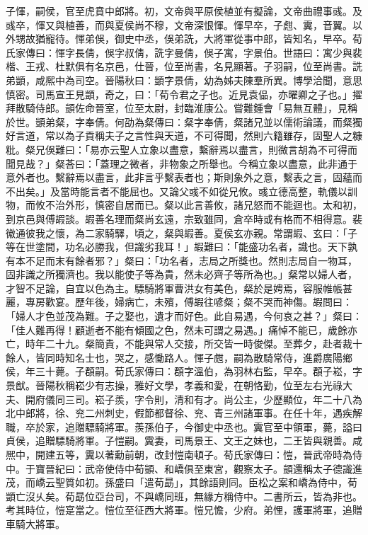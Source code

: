 \begin{pinyinscope}
子惲，嗣侯，官至虎賁中郎將。初，文帝與平原侯植並有擬論，文帝曲禮事彧。及彧卒，惲又與植善，而與夏侯尚不穆，文帝深恨惲。惲早卒，子甝、霬，音翼。以外甥故猶寵待。惲弟俁，御史中丞，俁弟詵，大將軍從事中郎，皆知名，早卒。荀氏家傳曰：惲字長倩，俁字叔倩，詵字曼倩，俁子寓，字景伯。世語曰：寓少與裴楷、王戎、杜默俱有名京邑，仕晉，位至尚書，名見顯著。子羽嗣，位至尚書。詵弟顗，咸熈中為司空。晉陽秋曰：顗字景倩，幼為姊夫陳羣所異。博學洽聞，意思慎密。司馬宣王見顗，奇之，曰：「荀令君之子也。近見袁偘，亦曜卿之子也。」擢拜散騎侍郎。顗佐命晉室，位至太尉，封臨淮康公。嘗難鍾會「易無互體」，見稱於世。顗弟粲，字奉倩。何劭為粲傳曰：粲字奉倩，粲諸兄並以儒術論議，而粲獨好言道，常以為子貢稱夫子之言性與天道，不可得聞，然則六籍雖存，固聖人之糠粃。粲兄俁難曰：「易亦云聖人立象以盡意，繫辭焉以盡言，則微言胡為不可得而聞見哉？」粲荅曰：「蓋理之微者，非物象之所舉也。今稱立象以盡意，此非通于意外者也。繫辭焉以盡言，此非言乎繫表者也；斯則象外之意，繫表之言，固蘊而不出矣。」及當時能言者不能屈也。又論父彧不如從兄攸。彧立德高整，軌儀以訓物，而攸不治外形，慎密自居而已。粲以此言善攸，諸兄怒而不能迴也。太和初，到京邑與傅嘏談。嘏善名理而粲尚玄遠，宗致雖同，倉卒時或有格而不相得意。裴徽通彼我之懷，為二家騎驛，頃之，粲與嘏善。夏侯玄亦親。常謂嘏、玄曰：「子等在世塗間，功名必勝我，但識劣我耳！」嘏難曰：「能盛功名者，識也。天下孰有本不足而末有餘者邪？」粲曰：「功名者，志局之所獎也。然則志局自一物耳，固非識之所獨濟也。我以能使子等為貴，然未必齊子等所為也。」粲常以婦人者，才智不足論，自宜以色為主。驃騎將軍曹洪女有美色，粲於是娉焉，容服帷帳甚麗，專房歡宴。歷年後，婦病亡，未殯，傅嘏往喭粲；粲不哭而神傷。嘏問曰：「婦人才色並茂為難。子之娶也，遺才而好色。此自易遇，今何哀之甚？」粲曰：「佳人難再得！顧逝者不能有傾國之色，然未可謂之易遇。」痛悼不能已，歲餘亦亡，時年二十九。粲簡貴，不能與常人交接，所交皆一時俊傑。至葬夕，赴者裁十餘人，皆同時知名士也，哭之，感慟路人。惲子甝，嗣為散騎常侍，進爵廣陽鄉侯，年三十薨。子頵嗣。荀氏家傳曰：頵字溫伯，為羽林右監，早卒。頵子崧，字景猷。晉陽秋稱崧少有志操，雅好文學，孝義和愛，在朝恪勤，位至左右光祿大夫、開府儀同三司。崧子羨，字令則，清和有才。尚公主，少歷顯位，年二十八為北中郎將，徐、兖二州刺史，假節都督徐、兖、青三州諸軍事。在任十年，遇疾解職，卒於家，追贈驃騎將軍。羨孫伯子，今御史中丞也。霬官至中領軍，薨，謚曰貞侯，追贈驃騎將軍。子愷嗣。霬妻，司馬景王、文王之妹也，二王皆與親善。咸熈中，開建五等，霬以著勳前朝，改封愷南頓子。荀氏家傳曰：愷，晉武帝時為侍中。于寶晉紀曰：武帝使侍中荀顗、和嶠俱至東宮，觀察太子。顗還稱太子德識進茂，而嶠云聖質如初。孫盛曰「遣荀勗」，其餘語則同。臣松之案和嶠為侍中，荀顗亡沒乆矣。荀勗位亞台司，不與嶠同班，無緣方稱侍中。二書所云，皆為非也。考其時位，愷寔當之。愷位至征西大將軍。愷兄憺，少府。弟悝，護軍將軍，追贈車騎大將軍。


\end{pinyinscope}
